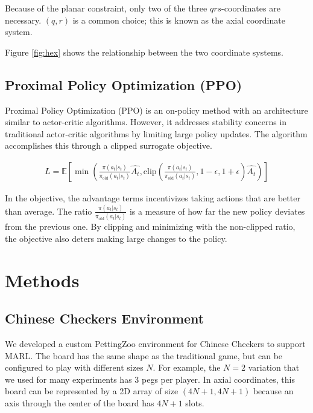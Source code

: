 \documentclass[12pt, a4paper, twocolumn]{article}
\begin{document}
Because of the planar constraint, only two of the three $qrs$-coordinates are necessary. $(q, r)$ is a common choice; this is known as the axial coordinate system.

Figure \ref{fig:hex} shows the relationship between the two coordinate systems.

\subsection{Proximal Policy Optimization (PPO)}

Proximal Policy Optimization\cite{PPO} (PPO) is an on-policy method with an architecture similar to actor-critic algorithms. However, it addresses stability concerns in traditional actor-critic algorithms by limiting large policy updates. The algorithm accomplishes this through a clipped surrogate objective.

\begin{align*}
  L = \mathbb{E}[\min(\frac{\pi(a_t | s_t)}{\pi_{\text{old}}(a_t | s_t)} \hat{A_t}, \text{clip}(\frac{\pi(a_t | s_t)}{\pi_{\text{old}}(a_t | s_t)}, 1 - \epsilon, 1 + \epsilon) \hat{A_t})]
\end{align*}

In the objective, the advantage terms incentivizes taking actions that are better than average. The ratio $\frac{\pi(a_t | s_t)}{\pi_{\text{old}}(a_t | s_t)}$ is a measure of how far the new policy deviates from the previous one. By clipping and minimizing with the non-clipped ratio, the objective also deters making large changes to the policy. 

\section{Methods}

\subsection{Chinese Checkers Environment}

We developed a custom PettingZoo environment for Chinese Checkers to support MARL. The board has the same shape as the traditional game, but can be configured to play with different sizes $N$. For example, the $N = 2$ variation that we used for many experiments has 3 pegs per player. In axial coordinates, this board can be represented by a 2D array of size $(4N + 1, 4N + 1)$ because an axis through the center of the board has $4N + 1$ slots.
\end{document}
